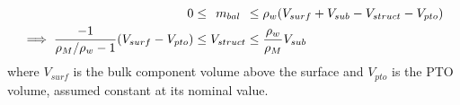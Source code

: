 \begin{equation}\label{eq:vol-constraint}
\begin{aligned}0 &\le{}\\ \implies \frac{-1}{\rho_M/\rho_w - 1}(V_{surf}-V_{pto}) &\le{} \end{aligned}\!
\begin{gathered} m_{bal}\\ \phant V_{struct} \end{gathered}\!
\begin{aligned}{}&\le{}\rho_w (V_{surf}+V_{sub}-V_{struct}-V_{pto})\\ &\le {}\phant \frac{\rho_w}{\rho_M} V_{sub} \end{aligned}
\end{equation}
where $V_{surf}$ is the bulk component volume above the surface and $V_{pto}$ is the PTO volume, assumed constant at its nominal value. %

